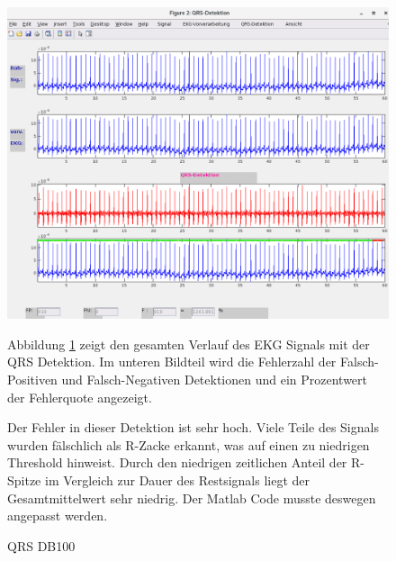 \documentclass[a4paper,12pt,titlepage]{scrartcl}
\begin{document}
\begin{figure}[ht]
    \begin{minipage}[t]{0.5\linewidth}
        \centering
        \includegraphics[width=0.9\linewidth, valign=t]{Assets/LaborBMT-16-14-54.png}
        \caption{QRS DB100}
        \label{qrsdb100}
    \end{minipage}%
    \begin{minipage}[t]{0.5\linewidth}
        Abbildung \ref{qrsdb100} zeigt den gesamten Verlauf des EKG Signals mit der QRS Detektion. Im unteren Bildteil wird die Fehlerzahl der Falsch-Positiven und Falsch-Negativen Detektionen und ein Prozentwert der Fehlerquote angezeigt.

        Der Fehler in dieser Detektion ist sehr hoch. Viele Teile des Signals wurden fälschlich als R-Zacke erkannt, was auf einen zu niedrigen Threshold hinweist. Durch den niedrigen zeitlichen Anteil der R-Spitze im Vergleich zur Dauer des Restsignals liegt der Gesamtmittelwert sehr niedrig. Der Matlab Code musste deswegen angepasst werden.

    \end{minipage}
\end{figure}
\end{document}
